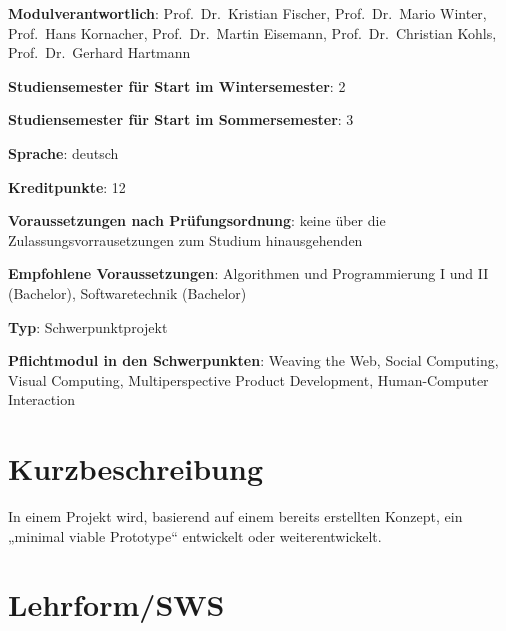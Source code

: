 \begin{modulHead}
\textbf{Modulverantwortlich}: Prof.~Dr.~Kristian
Fischer, Prof.~Dr.~Mario Winter, Prof.~Hans Kornacher, Prof.~Dr.~Martin
Eisemann, Prof.~Dr.~Christian Kohls, Prof.~Dr.~Gerhard
Hartmann
\end{modulHead}
\begin{modulHead}
\textbf{Studiensemester für
Start im Wintersemester}:
2
\end{modulHead}
\begin{modulHead}
\textbf{Studiensemester für Start
im Sommersemester}:
3
\end{modulHead}
\begin{modulHead}
\textbf{Sprache}:
deutsch
\end{modulHead}
\begin{modulHead}
\textbf{Kreditpunkte}:
12
\end{modulHead}
\begin{modulHead}
\textbf{Voraussetzungen nach
Prüfungsordnung}: keine über die Zulassungsvorrausetzungen zum Studium
hinausgehenden
\end{modulHead}
\begin{modulHead}
\textbf{Empfohlene
Voraussetzungen}: Algorithmen und Programmierung I und II (Bachelor),
Softwaretechnik
(Bachelor)
\end{modulHead}
\begin{modulHead}
\textbf{Typ}:
Schwerpunktprojekt
\end{modulHead}
\begin{modulHead}
\textbf{Pflichtmodul
in den Schwerpunkten}: Weaving the Web, Social Computing, Visual
Computing, Multiperspective Product Development, Human-Computer
Interaction
\end{modulHead}


\section*{Kurzbeschreibung\label{/mi-2017/modulbeschreibungen-master/MA_Modul_Projekt_Entwicklung}}\label{kurzbeschreibungpathlabelmi-2017modulbeschreibungen-mastermaux5fmodulux5fprojektux5fentwicklung}

In einem Projekt wird, basierend auf einem bereits erstellten Konzept,
ein „minimal viable Prototype`` entwickelt oder weiterentwickelt.

\section*{Lehrform/SWS\label{/mi-2017/modulbeschreibungen-master/MA_Modul_Projekt_Entwicklung}}\label{lehrformswspathlabelmi-2017modulbeschreibungen-mastermaux5fmodulux5fprojektux5fentwicklung}

